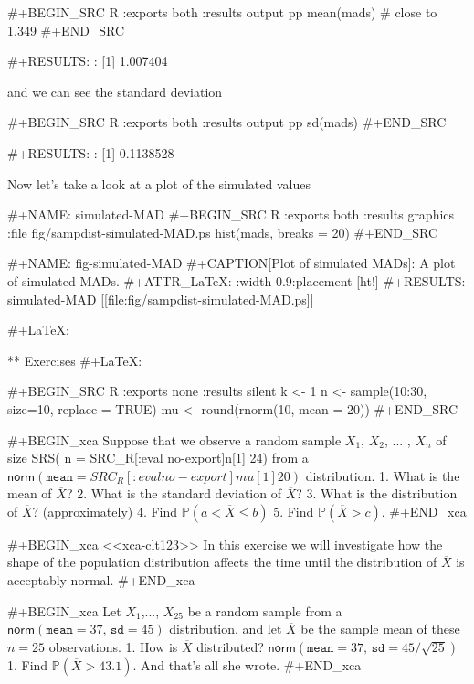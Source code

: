 #+BEGIN_SRC R :exports both :results output pp 
mean(mads)    # close to 1.349
#+END_SRC

#+RESULTS:
: [1] 1.007404

and we can see the standard deviation

#+BEGIN_SRC R :exports both :results output pp 
sd(mads)
#+END_SRC

#+RESULTS:
: [1] 0.1138528

Now let's take a look at a plot of the simulated values

#+NAME: simulated-MAD
#+BEGIN_SRC R :exports both :results graphics :file fig/sampdist-simulated-MAD.ps
hist(mads, breaks = 20)
#+END_SRC

#+NAME: fig-simulated-MAD
#+CAPTION[Plot of simulated MADs]: \small A plot of simulated MADs.
#+ATTR_LaTeX: :width 0.9\textwidth :placement [ht!]
#+RESULTS: simulated-MAD
[[file:fig/sampdist-simulated-MAD.ps]]

#+LaTeX: \newpage{}

** Exercises
#+LaTeX: \setcounter{thm}{0}

#+BEGIN_SRC R :exports none :results silent
k <- 1
n <- sample(10:30, size=10, replace = TRUE)
mu <- round(rnorm(10, mean = 20))
#+END_SRC

#+BEGIN_xca
Suppose that we observe a random sample \(X_{1}\), \(X_{2}\), ... ,
\(X_{n}\) of size SRS( n = SRC_R[:eval no-export]{n[1]} 24) from a \(
\mathsf{norm}(\mathtt{mean}= SRC_R[:eval no-export]{mu[1]} 20 )\) distribution.
1. What is the mean of \(\overline{X}\)?
2. What is the standard deviation of \(\overline{X}\)?
3. What is the distribution of \(\overline{X}\)? (approximately)
4. Find \(\mathbb{P}(a< \overline{X} \leq b)\)
5. Find \(\mathbb{P}(\overline{X} > c)\).
#+END_xca

#+BEGIN_xca
<<xca-clt123>> In this exercise we will investigate how the shape of
the population distribution affects the time until the distribution of
\(\overline{X}\) is acceptably normal.
#+END_xca

#+BEGIN_xca
Let \(X_{1}\),..., \(X_{25}\) be a random sample from a
\(\mathsf{norm}(\mathtt{mean}=37,\,\mathtt{sd}=45)\) distribution, and
let \(\overline{X}\) be the sample mean of these \(n=25\)
observations.
1. How is \(\overline{X}\) distributed? 
   \(\mathsf{norm}(\mathtt{mean}=37,\,\mathtt{sd}=45/\sqrt{25})\) 
1. Find \(\mathbb{P}(\overline{X} > 43.1)\).
And that's all she wrote.
#+END_xca
